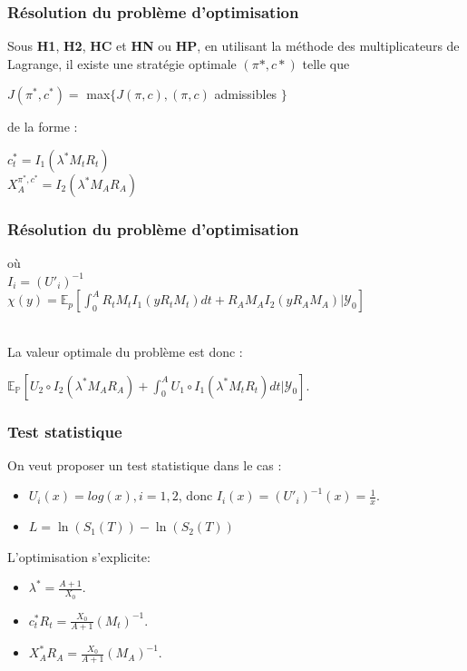 \documentclass[french]{beamer}
\begin{document}
\begin{frame}
\frametitle{Résolution du problème d'optimisation}
Sous \textbf{H1}, \textbf{H2}, \textbf{HC} et \textbf{HN} ou \textbf{HP}, en utilisant la méthode des multiplicateurs de Lagrange, il existe une stratégie optimale $(\pi*, c*)$ telle que 
\begin{center}
$J(\pi^*, c^*) =$ max$\{ J(\pi, c), (\pi, c)$ admissibles $\}$
\end{center}
 de la forme : 
\begin{center}
$c^*_t = I_1(\lambda^* M_t R_t)$\\
$X^{\pi^*, c^*}_A = I_2(\lambda^* M_A R_A)$\\
\end{center}
\end{frame}

\begin{frame}
\frametitle{Résolution du problème d'optimisation}
où \\
$I_i = (U'_i)^{-1}$ \\
$\chi (y) = \mathbb{E}_p[\int_{0}^{A} R_t M_t I_1(yR_t M_t)dt + R_A M_A I_2(yR_A M_A) | \mathcal{Y}_0]$\\
\

La valeur optimale du problème est donc : 
\begin{center}
$\mathbb{E}_{\mathbb{P}} [ U_2 \circ I_2 (\lambda^* M_A R_A) + \int_{0}^{A} U_1 \circ I_1 (\lambda^* M_t R_t)dt | \mathcal{Y}_0]$.
\end{center}
\end{frame}

\begin{frame}
\frametitle{Test statistique}
On veut proposer un test statistique dans le cas :
\begin{itemize}
\item $U_i (x) = log(x), i = 1, 2$, donc $I_i (x) = (U'_i)^{-1}(x) = \frac{1}{x}$.
\item $L = \ln\left(S_{1} \left(T \right) \right) - \ln\left( S_{2} \left( T \right) \right)$
\end{itemize}
L'optimisation s'explicite:
\begin{itemize}
\item $\lambda^* = \frac{A+1}{X_0}$.
\item $c^*_t R_t= \frac{X_0}{A+1} (M_t)^{-1}$.
\item $X^*_A R_A= \frac{X_0}{A+1} (M_A)^{-1}$.
\end{itemize}
\end{frame}
\end{document}
